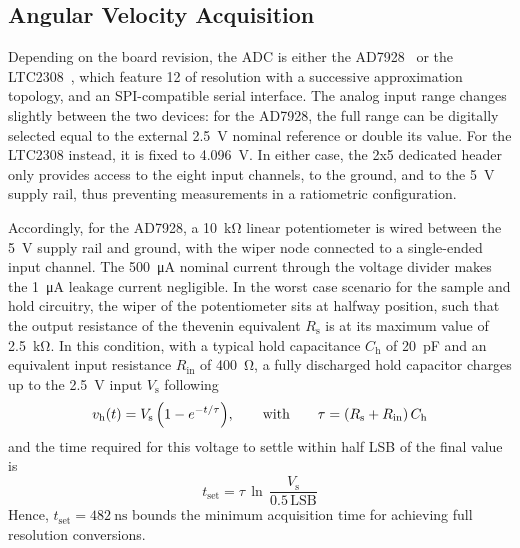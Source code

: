 \documentclass[]{article}
\begin{document}
\subsection{Angular Velocity Acquisition}\label{subsec:adc}

Depending on the board revision, the ADC is either the AD7928~\cite{ad7928} or the LTC2308~\cite{ltc2308}, which feature \qty{12}{\bit} of resolution with a successive approximation topology, and an SPI-compatible serial interface. The analog input range changes slightly between the two devices: for the AD7928, the full range can be digitally selected equal to the external \qty{2.5}{\volt} nominal reference or double its value. For the LTC2308 instead, it is fixed to \qty{4.096}{\volt}. In either case, the 2x5 dedicated header only provides access to the eight input channels, to the ground, and to the \qty{5}{\volt} supply rail, thus preventing measurements in a ratiometric configuration.
    
Accordingly, for the AD7928, a \qty{10}{\kohm} linear potentiometer is wired between the \qty{5}{\volt} supply rail and ground, with the wiper node connected to a single-ended input channel. The \qty{500}{\uA} nominal current through the voltage divider makes the \qty{1}{\uA} leakage current negligible.
In the worst case scenario for the sample and hold circuitry, the wiper of the potentiometer sits at halfway position, such that the output resistance of the thevenin equivalent $R_\text{s}$ is at its maximum value of \qty{2.5}{\kohm}. 
In this condition, with a typical hold capacitance $C_\text{h}$ of \qty{20}{\pF} and an equivalent input resistance $R_\text{in}$ of \qty{400}{\ohm}, a fully discharged hold capacitor charges up to the \qty{2.5}{\volt} input $V_\text{s}$ following
\[
    v_\text{h}\pqty*{t} = V_\text{s}\,\pqty*{1-e^{-t/\tau}}
    ,\qquad \text{with}\qquad \tau = \pqty*{R_\text{s}+R_\text{in}}\,C_\text{h}
\]
and the time required for this voltage to settle within half LSB of the final value is
\begin{equation}\label{eq:tset}
    t_\text{set} = \tau\,\ln\,\frac{V_\text{s}}{0.5 \,\text{LSB}}
\end{equation}
Hence, $t_\text{set} = \qty{482}{\ns}$ bounds the minimum acquisition time for achieving full resolution conversions.
\end{document}
